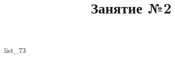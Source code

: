 \documentclass[12pt, a4paper]{article}
\begin{document}
	\title{Занятие №2}
	{list_73}
\end{document}
